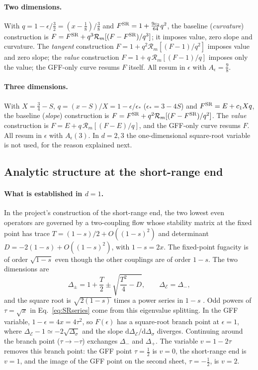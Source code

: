 \documentclass[11pt,a4paper]{article}
\numberwithin{equation}{section}
\newcommand{\De}{\Delta_{\mathcal E}}   %
\newcommand{\Ds}{\Delta_\sigma}
\newcommand{\Ae}{A_\epsilon}
\newcommand{\cR}{\mathcal R}
\begin{document}
\paragraph{Two dimensions.} With $q=1-\epsilon/\frac32=(x-\frac18)/\frac38$ and
$F^{\rm SR}=1+\frac{9c_2}{64}q^2$, the baseline (\emph{curvature}) construction is
$F=F^{\rm SR}+q^3\cR_m[(F-F^{\rm SR})/q^3]$; it imposes value, zero slope and curvature. The
\emph{tangent} construction $F=1+q^2\cR_m[(F-1)/q^2]$ imposes value and zero slope; the
\emph{value} construction $F=1+q\,\cR_m[(F-1)/q]$ imposes only the value; the
GFF-only curve resums $F$ itself. All resum in $\epsilon$ with
$\Ae=\frac98$.

\paragraph{Three dimensions.} With $X=\frac34-S$, $q=(x-S)/X=1-\epsilon/\epsilon_*$
($\epsilon_*=3-4S$) and $F^{\rm SR}=E+c_1Xq$, the baseline (\emph{slope}) construction is
$F=F^{\rm SR}+q^2\cR_m[(F-F^{\rm SR})/q^2]$. The \emph{value} construction is
$F=E+q\,\cR_m[(F-E)/q]$, and the GFF-only curve resums $F$. All resum in
$\epsilon$ with $\Ae(3)$. In $d=2,3$ the one-dimensional square-root variable is not used,
for the reason explained next.

\subsection{Analytic structure at the short-range end}\label{sec:analytic}
\paragraph{What is established in $d=1$.} In the project's construction of the
short-range end, the two lowest even operators are governed by a two-coupling flow whose
stability matrix at the fixed point has trace $T=(1-s)/2+O((1-s)^2)$ and determinant
$D=-2(1-s)+O((1-s)^2)$, with $1-s=2x$. The fixed-point fugacity is of order $\sqrt{1-s}$
even though the other couplings are of order $1-s$. The two dimensions
are
\begin{equation}
 \Delta_\pm=1+\frac T2\pm\sqrt{\frac{T^2}{4}-D},\qquad \De=\Delta_-,
 \label{eq:split}
\end{equation}
and the square root is $\sqrt{2(1-s)}$ times a power series in $1-s$
\cite{Benedetti:2025nzp}. Odd powers of $\tau=\sqrt x$ in Eq.~\eqref{eq:SRseries} come from
this eigenvalue splitting. In the GFF variable, $1-\epsilon=4x=4\tau^2$, so $F(\epsilon)$ has
a square-root branch point at $\epsilon=1$, where $\De-1\simeq-2\sqrt{\Ds}$ and the slope
$\mathrm d\De/\mathrm d\Ds$ diverges. Continuing around the branch point ($\tau\to-\tau$)
exchanges $\Delta_-$ and $\Delta_+$. The variable $v=1-2\tau$ removes this branch point:
the GFF point $\tau=\frac12$ is $v=0$, the short-range end is $v=1$, and the image of the
GFF point on the second sheet, $\tau=-\frac12$, is $v=2$.
\end{document}
